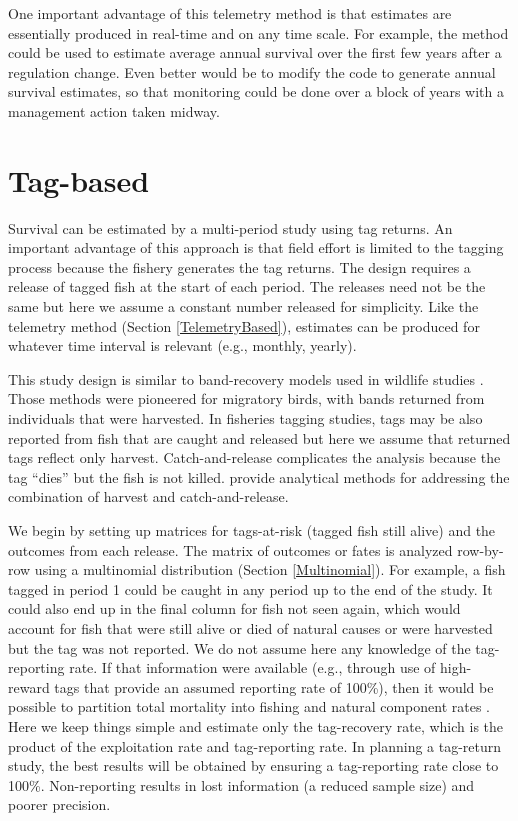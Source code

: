 \documentclass[
]{krantz}
\begin{document}
One important advantage of this telemetry method is that estimates are essentially produced in real-time and on any time scale. For example, the method could be used to estimate average annual survival over the first few years after a regulation change. Even better would be to modify the code to generate annual survival estimates, so that monitoring could be done over a block of years with a management action taken midway.

\hypertarget{BrownieSurvival}{%
\section{Tag-based}\label{BrownieSurvival}}

Survival can be estimated by a multi-period study using tag returns. An important advantage of this approach is that field effort is limited to the tagging process because the fishery generates the tag returns. The design requires a release of tagged fish at the start of each period. The releases need not be the same but here we assume a constant number released for simplicity. Like the telemetry method (Section \ref{TelemetryBased}), estimates can be produced for whatever time interval is relevant (e.g., monthly, yearly).

This study design is similar to band-recovery models used in wildlife studies \citep{brownie.etal1985, kéry.schaub_2011}. Those methods were pioneered for migratory birds, with bands returned from individuals that were harvested. In fisheries tagging studies, tags may be also reported from fish that are caught and released but here we assume that returned tags reflect only harvest. Catch-and-release complicates the analysis because the tag ``dies'' but the fish is not killed. \citet{jiang.etal2007} provide analytical methods for addressing the combination of harvest and catch-and-release.

We begin by setting up matrices for tags-at-risk (tagged fish still alive) and the outcomes from each release. The matrix of outcomes or fates is analyzed row-by-row using a multinomial distribution (Section \ref{Multinomial}). For example, a fish tagged in period 1 could be caught in any period up to the end of the study. It could also end up in the final column for fish not seen again, which would account for fish that were still alive or died of natural causes or were harvested but the tag was not reported. We do not assume here any knowledge of the tag-reporting rate. If that information were available (e.g., through use of high-reward tags that provide an assumed reporting rate of 100\%), then it would be possible to partition total mortality into fishing and natural component rates \citep{brownie.etal1985}. Here we keep things simple and estimate only the tag-recovery rate, which is the product of the exploitation rate and tag-reporting rate. In planning a tag-return study, the best results will be obtained by ensuring a tag-reporting rate close to 100\%. Non-reporting results in lost information (a reduced sample size) and poorer precision.
\end{document}
